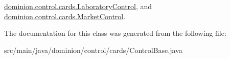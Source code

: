 \hyperlink{classdominion_1_1control_1_1cards_1_1LaboratoryControl_ac7bf7558342e5e906a883542fa10ccda}{dominion.\-control.\-cards.\-Laboratory\-Control}, and \hyperlink{classdominion_1_1control_1_1cards_1_1MarketControl_a561bb7ca6d746f31885ed2abc6e4b02d}{dominion.\-control.\-cards.\-Market\-Control}.



\-The documentation for this class was generated from the following file\-:\begin{DoxyCompactItemize}
\item 
src/main/java/dominion/control/cards/\-Control\-Base.\-java\end{DoxyCompactItemize}
